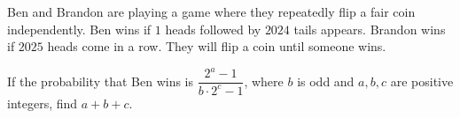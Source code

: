 Ben and Brandon are playing a game where they repeatedly flip a fair coin independently. Ben wins if $1$ heads followed by $2024$ tails appears. Brandon wins if $2025$ heads come in a row. They will flip a coin until someone wins.

If the probability that Ben wins is $\dfrac{2^a-1}{b\cdot 2^c-1}$, where $b$ is odd and $a,b,c$ are positive integers, find $a+b+c$.

